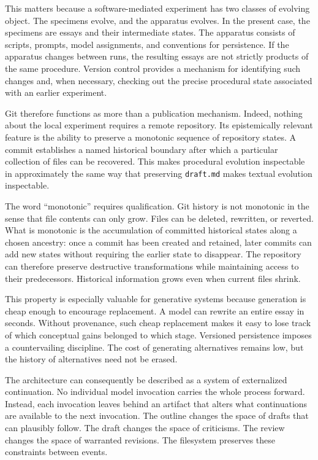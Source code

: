 \documentclass[11pt]{article}
\begin{document}
This matters because a software-mediated experiment has two classes of evolving object. The specimens evolve, and the apparatus evolves. In the present case, the specimens are essays and their intermediate states. The apparatus consists of scripts, prompts, model assignments, and conventions for persistence. If the apparatus changes between runs, the resulting essays are not strictly products of the same procedure. Version control provides a mechanism for identifying such changes and, when necessary, checking out the precise procedural state associated with an earlier experiment.

Git therefore functions as more than a publication mechanism. Indeed, nothing about the local experiment requires a remote repository. Its epistemically relevant feature is the ability to preserve a monotonic sequence of repository states. A commit establishes a named historical boundary after which a particular collection of files can be recovered. This makes procedural evolution inspectable in approximately the same way that preserving \texttt{draft.md} makes textual evolution inspectable.

The word ``monotonic'' requires qualification. Git history is not monotonic in the sense that file contents can only grow. Files can be deleted, rewritten, or reverted. What is monotonic is the accumulation of committed historical states along a chosen ancestry: once a commit has been created and retained, later commits can add new states without requiring the earlier state to disappear. The repository can therefore preserve destructive transformations while maintaining access to their predecessors. Historical information grows even when current files shrink.

This property is especially valuable for generative systems because generation is cheap enough to encourage replacement. A model can rewrite an entire essay in seconds. Without provenance, such cheap replacement makes it easy to lose track of which conceptual gains belonged to which stage. Versioned persistence imposes a countervailing discipline. The cost of generating alternatives remains low, but the history of alternatives need not be erased.

The architecture can consequently be described as a system of externalized continuation. No individual model invocation carries the whole process forward. Instead, each invocation leaves behind an artifact that alters what continuations are available to the next invocation. The outline changes the space of drafts that can plausibly follow. The draft changes the space of criticisms. The review changes the space of warranted revisions. The filesystem preserves these constraints between events.
\end{document}
